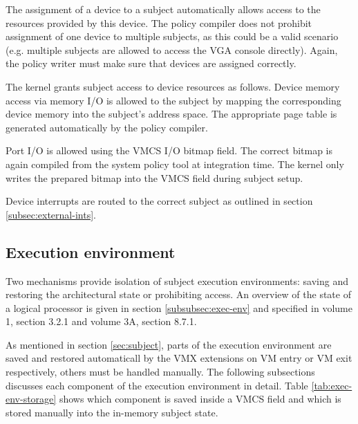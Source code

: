 The assignment of a device to a subject automatically allows access to the
resources provided by this device. The policy compiler does not prohibit
assignment of one device to multiple subjects, as this could be a valid scenario
(e.g.  multiple subjects are allowed to access the VGA console directly). Again,
the policy writer must make sure that devices are assigned correctly.

The kernel grants subject access to device resources as follows. Device memory
access via memory I/O is allowed to the subject by mapping the corresponding
device memory into the subject's address space. The appropriate page table is
generated automatically by the policy compiler.

Port I/O is allowed using the VMCS I/O bitmap field. The correct bitmap is again
compiled from the system policy tool at integration time. The kernel only writes
the prepared bitmap into the VMCS field during subject setup.

Device interrupts are routed to the correct subject as outlined in section
\ref{subsec:external-ints}.

\subsection{Execution environment}
Two mechanisms provide isolation of subject execution environments: saving and
restoring the architectural state or prohibiting access. An overview of the
state of a logical processor is given in section \ref{subsubsec:exec-env} and
specified in \cite{IntelSDM} volume 1, section 3.2.1 and volume 3A,
section 8.7.1.

As mentioned in section \ref{sec:subject}, parts of the execution environment
are saved and restored automaticall by the VMX extensions on VM entry or VM exit
respectively, others must be handled manually. The following subsections
discusses each component of the execution environment in detail. Table
\ref{tab:exec-env-storage} shows which component is saved inside a VMCS field
and which is stored manually into the in-memory subject state.

